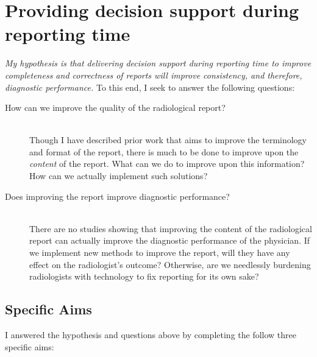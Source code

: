 \section{Providing decision support during reporting time}

\emph{My hypothesis is that delivering decision support during reporting time to improve completeness and correctness of reports will improve consistency, and therefore, diagnostic performance.} To this end, I seek to answer the following questions:

\begin{description}
	\item[How can we improve the quality of the radiological report?] \hfill \\
	Though I have described prior work that aims to improve the terminology and format of the report, there is much to be done to improve upon the \emph{content} of the report. What can we do to improve upon this information? How can we actually implement such solutions?
	
	\item[Does improving the report improve diagnostic performance?] \hfill \\
	There are no studies showing that improving the content of the radiological report can actually improve the diagnostic performance of the physician. If we implement new methods to improve the report, will they have any effect on the radiologist's outcome? Otherwise, are we needlessly burdening radiologists with technology to fix reporting for its own sake?
		
\end{description}


\subsection{Specific Aims}

I answered the hypothesis and questions above by completing the follow three specific aims:

